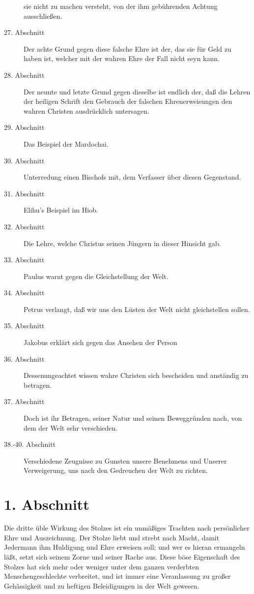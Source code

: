 \begin{description}
sie nicht zu machen versteht, von der ihm gebührenden Achtung ausschließen.
\item[27. Abschnitt] Der achte Grund gegen diese falsche Ehre ist der, das sie
für Geld zu haben ist, welcher mit der wahren Ehre der Fall nicht seyn kann.
\item[28. Abschnitt] Der neunte und letzte Grund gegen dieselbe ist endlich der,
daß die Lehren der heiligen Schrift den Gebrauch der falschen Ehrenerweisungen
den wahren Christen ausdrücklich untersagen.
\item[29. Abschnitt] Das Beispiel der Mardochai.
\item[30. Abschnitt] Unterredung einen Bischofs mit, dem Verfasser über diesen
Gegenstand.
\item[31. Abschnitt] Elihu's Beispiel im Hiob.
\item[32. Abschnitt] Die Lehre, welche Christus seinen Jüngern in dieser
Hinsicht gab.
\item[33. Abschnitt] Paulus warnt gegen die Gleichstellung der Welt.
\item[34. Abschnitt] Petrus verlangt, daß wir uns den Lüsten der Welt nicht
gleichstellen sollen.
\item[35. Abschnitt] Jakobus erklärt sich gegen das Ansehen der Person
\item[36. Abschnitt] Dessenungeachtet wissen wahre Christen sich bescheiden und
anständig zu betragen.
\item[37. Abschnitt] Doch ist ihr Betragen, seiner Natur und seinen Beweggründen
nach, von dem der Welt sehr verschieden.
\item[38.-40. Abschnitt] Verschiedene Zeugnisse zu Gunsten unsere Benehmens und
Unserer Verweigerung, uns nach den Gedreuchen der Welt zu richten.

\end{description}
\normalsize

\section{1. Abschnitt}

Die dritte üble Wirkung des Stolzes ist ein unmäßiges Trachten nach persönlicher
Ehre und Auszeichnung. Der Stolze liebt und strebt nach Macht, damit Jedermann
ihm Huldigung und Ehre erweisen soll; und wer es hieran ermangeln läßt, setzt
sich seinem Zorne und seiner Rache aus. Diese böse Eigenschaft des Stolzes hat
sich mehr oder weniger unter dem ganzen verderbten Menschengeschlechte
verbreitet, und ist immer eine Veranlassung zu großer Gehässigkeit und zu
heftigen Beleidigungen in der Welt gewesen.

